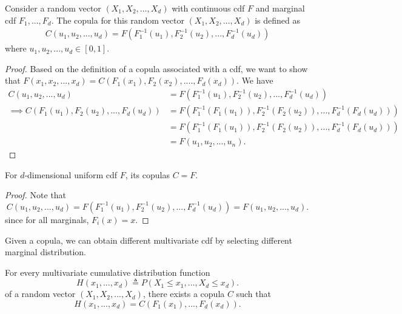 \begin{refsection}
\begin{theorem}\label{ch:statistical-models:th:constructCopulaForJointDistribution}
	Consider a random vector $(X_1,X_2,...,X_d)$ with continuous cdf $F$ and marginal cdf $F_1,...,F_d$. The copula for this random vector $(X_1,X_2,...,X_d)$ is defined as
	\begin{align*}
	C(u_1,u_2,...,u_d) = F(F_1^{-1}(u_1),F_2^{-1}(u_2),..., F_d^{-1}(u_d))
	\end{align*}
where $u_1,u_2,...,u_d\in [0,1]$.	
\end{theorem}
\begin{proof}
Based on the definition of a copula associated with a cdf, we want to show that $F(x_1,x_2,...,x_d) = C(F_1(x_1),F_2(x_2),....,F_d(x_d)).$
We have	
\begin{align*}
C(u_1,u_2,...,u_d) &= F(F_1^{-1}(u_1),F_2^{-1}(u_2),..., F_d^{-1}(u_d)) \\
\implies C(F_1(u_1),F_2(u_2),...,F_d(u_d)) &= F(F_1^{-1}(F_1(u_1)),F_2^{-1}(F_2(u_2)),..., F_d^{-1}(F_d(u_d))) \\
&= F(F_1^{-1}(F_1(u_1)),F_2^{-1}(F_2(u_2)),..., F_d^{-1}(F_d(u_d))) \\
&= F(u_1,u_2,...,u_n).
\end{align*}	
\end{proof}

\begin{lemma}\label{ch:statistical-models:th:CopulaOfUniformDistribution}
For $d$-dimensional uniform cdf $F$, its copulas $C = F$.
\end{lemma}
\begin{proof}
Note that
$$C(u_1,u_2,...,u_d) = F(F_1^{-1}(u_1),F_2^{-1}(u_2),..., F_d^{-1}(u_d))
= F(u_1,u_2,...,u_d).$$
since for all marginals, $F_i(x) = x.$
\end{proof}




\begin{remark}
Given a copula, we can obtain different multivariate cdf by selecting different marginal distribution.
\end{remark}



\begin{theorem}\label{ch:statistical-models:SklarTheorem}
For every multivariate cumulative distribution function
$$H(x_1,...,x_d) \triangleq P(X_1\leq x_1,...,X_d \leq x_d).$$
of a random vector $(X_1,X_2,...,X_d)$, there exists a copula $C$ such that
$$H(x_1,...,x_d) = C(F_1(x_1),...,F_d(x_d)).$$


\end{theorem}
\end{refsection}
